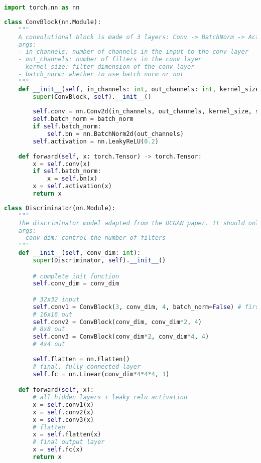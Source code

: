 \begin{lstlisting}[language=Python]
import torch.nn as nn
\end{lstlisting}

\begin{lstlisting}[language=Python]
class ConvBlock(nn.Module):
    """
    A convolutional block is made of 3 layers: Conv -> BatchNorm -> Activation.
    args:
    - in_channels: number of channels in the input to the conv layer
    - out_channels: number of filters in the conv layer
    - kernel_size: filter dimension of the conv layer
    - batch_norm: whether to use batch norm or not
    """
    def __init__(self, in_channels: int, out_channels: int, kernel_size: int, batch_norm: bool = True):
        super(ConvBlock, self).__init__()
        
        self.conv = nn.Conv2d(in_channels, out_channels, kernel_size, stride=2, padding=1, bias=False)
        self.batch_norm = batch_norm
        if self.batch_norm:
            self.bn = nn.BatchNorm2d(out_channels)
        self.activation = nn.LeakyReLU(0.2)
        
    def forward(self, x: torch.Tensor) -> torch.Tensor:
        x = self.conv(x)
        if self.batch_norm:
            x = self.bn(x)
        x = self.activation(x)
        return x
\end{lstlisting}

\begin{lstlisting}[language=Python]
class Discriminator(nn.Module):
    """
    The discriminator model adapted from the DCGAN paper. It should only contains a few layers.
    args:
    - conv_dim: control the number of filters
    """
    def __init__(self, conv_dim: int):
        super(Discriminator, self).__init__()

        # complete init function
        self.conv_dim = conv_dim

        # 32x32 input
        self.conv1 = ConvBlock(3, conv_dim, 4, batch_norm=False) # first layer, no batch_norm
        # 16x16 out
        self.conv2 = ConvBlock(conv_dim, conv_dim*2, 4)
        # 8x8 out
        self.conv3 = ConvBlock(conv_dim*2, conv_dim*4, 4)
        # 4x4 out
        
        self.flatten = nn.Flatten()
        # final, fully-connected layer
        self.fc = nn.Linear(conv_dim*4*4*4, 1)

    def forward(self, x):
        # all hidden layers + leaky relu activation
        x = self.conv1(x)
        x = self.conv2(x)
        x = self.conv3(x)
        # flatten
        x = self.flatten(x)
        # final output layer
        x = self.fc(x)        
        return x
\end{lstlisting}

